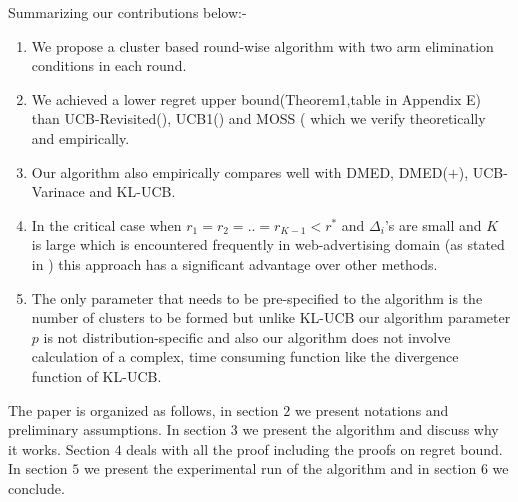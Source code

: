 	Summarizing our contributions below:-
\begin{enumerate}
\item We propose a cluster based round-wise algorithm with two arm elimination conditions in each round.
\item We achieved a lower regret upper bound(Theorem1,table in Appendix E) than UCB-Revisited(\cite{auer2010ucb}), UCB1(\cite{auer2002finite}) and MOSS (\cite{audibert2009minimax} which we verify theoretically and empirically.
\item Our algorithm also empirically compares well with DMED, DMED($+$), UCB-Varinace and KL-UCB.
\item In the critical case when $r_{1}=r_{2}=..=r_{K-1}<r^{*}$ and $\Delta_{i}$'s are small and $K$ is large which is encountered frequently in web-advertising domain (as stated in \cite{garivier2011kl}) this approach has a significant advantage over other methods.
\item The only parameter that needs to be pre-specified to the algorithm is the number of clusters to be formed but unlike KL-UCB our algorithm parameter $p$ is not distribution-specific and also our algorithm does not involve calculation of a complex, time consuming function like the divergence function of KL-UCB.
\end{enumerate}
	
	The paper is organized as follows, in section $2$ we present notations and preliminary assumptions. In section $3$ we present the algorithm and discuss why it works. Section $4$ deals with all the proof including the proofs on regret bound. In section $5$ we present the experimental run of the algorithm and in section $6$ we conclude. 
